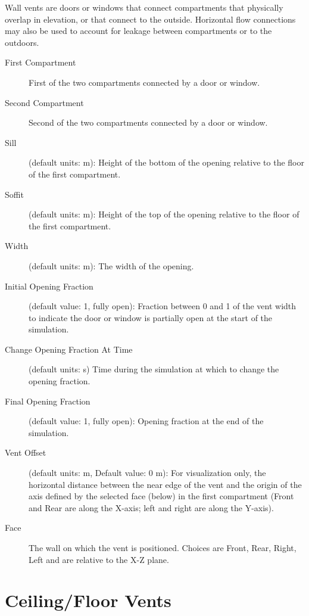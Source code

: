 Wall vents are doors or windows that connect compartments that physically overlap in elevation, or that connect to the outside. Horizontal flow connections may also be used to account for leakage between compartments or to the outdoors.

\begin{description}
\item[First Compartment] First of the two compartments connected by a door or window.
\item[Second Compartment] Second of the two compartments connected by a door or window.
\item[Sill] (default units: m): Height of the bottom of the opening relative to the floor of the first compartment.
\item[Soffit] (default units: m): Height of the top of the opening relative to the floor of the first compartment.
\item[Width] (default units: m): The width of the opening.
\item[Initial Opening Fraction] (default value: 1, fully open): Fraction between 0 and 1 of the vent width to indicate the door or window is partially open at the start of the simulation.
\item[Change Opening Fraction At Time]  (default units: s)  Time during the simulation at which to change the opening fraction.
\item[Final Opening Fraction] (default value: 1, fully open): Opening fraction at the end of the simulation.
\item[Vent Offset] (default units: m, Default value: 0 m): For visualization only, the horizontal distance between the near edge of the vent and the origin of the axis defined by the selected face (below) in the first compartment (Front and Rear are along the X-axis; left and right are along the Y-axis).
\item[Face] The wall on which the vent is positioned.  Choices are Front, Rear, Right, Left and are relative to the X-Z plane.
\end{description}



\section{Ceiling/Floor Vents}

